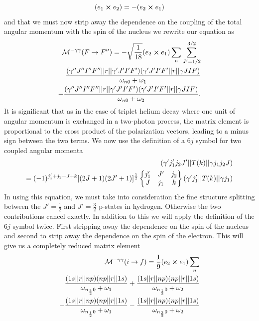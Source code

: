 \begin{equation}
    (e_1\cross e_2)=-(e_2\cross e_1)
\end{equation}
and that we must now strip away the dependence on the coupling of the total angular momentum with the spin of the nucleus we rewrite our equation as
\begin{equation}
\begin{split}
    \mathcal{M}^{-\gamma\gamma}(F\rightarrow F'')=
    -\sqrt{\frac{1}{18}} (e_2\cross e_1)\sum_{n}\sum_{J'=1/2}^{3/2}\\
    \frac{
    (\gamma''J''I'' F''\abs{\abs{r}}\gamma'J'I' F')
    (\gamma'J'I' F'\abs{\abs{r}}\gamma JI F)}
    {\omega_{n0}+\omega_{1}}\\
    -
    \frac{
    (\gamma''J''I'' F'' \abs{\abs{r}}\gamma'J'I' F')
    (\gamma'J'I' F'\abs{\abs{r}}\gamma JI F)}
    {\omega_{n0}+\omega_{2}}.
    \end{split}
\end{equation}
It is significant that as in the case of triplet helium decay \cite{dalgarnohelium} where one unit of angular momentum is exchanged in a two-photon process, the matrix element is proportional to the cross product of the polarization vectors, leading to a minus sign between the two terms. We now use the definition of a $6j$ symbol for two coupled angular momenta \cite{edmonds7}
\begin{equation}
\begin{split}
        (\gamma'j_1'j_2J'\abs{\abs{T(k)}}\gamma j_1 j_2 J)\\
        =(-1)^{j_1'+j_2+J+k}[(2J+1)(2J'+1)]^{\frac{1}{2}}
        \begin{Bmatrix}
        j_1' & J'  &j_2\\
        J    & j_1 &k
        \end{Bmatrix}
        (\gamma' j_1'\abs{\abs{T(k)}}\gamma j_1)
\end{split}
\end{equation}
In using this equation, we must take into consideration the fine structure splitting between the $J'=\frac{1}{2}$ and $J'=\frac{3}{2}$ p-states in hydrogen. Otherwise the two contributions cancel exactly. In addition to this we will apply the definition of the $6j$ symbol twice. First stripping away the dependence on the spin of the nucleus and second to strip away the dependence on the spin of the electron. This will give us a completely reduced matrix element
\begin{equation}
\begin{split}
    \mathcal{M}^{-\gamma\gamma}(i\rightarrow f)=
    \frac{1}{9}(e_2\cross e_1)
    \sum_{n}\\
    \frac{
    (1s\abs{\abs{r}}np)(np\abs{\abs{r}}1s)}     {\omega_{n_{\frac{3}{2}}0}+\omega_{1}}
    +
    \frac{
    (1s\abs{\abs{r}}np)(np\abs{\abs{r}}1s) }    {\omega_{n_{\frac{1}{2}}0}+\omega_{2}}\\
    -
    \frac{
    (1s\abs{\abs{r}}np)(np\abs{\abs{r}}1s) }    {\omega_{n_{\frac{1}{2}}0}+\omega_{1}}
    -
    \frac{
    (1s\abs{\abs{r}}np)(np\abs{\abs{r}}1s) }    {\omega_{n_{\frac{3}{2}}0}+\omega_{2}}
    \end{split}
\end{equation}
